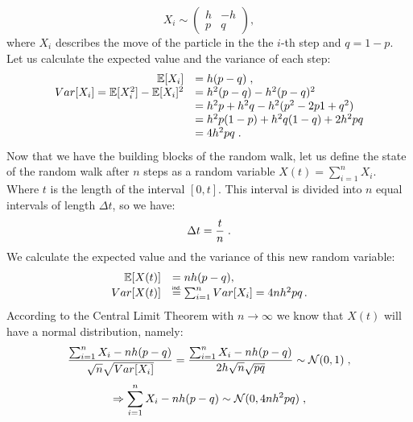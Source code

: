 \documentclass[times, utf8, diplomski]{fer}
\begin{document}
\begin{equation}
X_i \sim \left( \begin{array}{cc} h & -h \\
					p & q \end{array} \right),
\end{equation}
where $X_i$ describes the move of the particle in the the $i$-th step and $q=1-p$.
Let us calculate the expected value and the variance of each step:
\begin{equation}
	\begin{array}{rl}
									\mathbb{E}[X_i] &= h(p-q)\hspace{0.1cm}, \\
		Var[X_i] = \mathbb{E}[X_i^2] - \mathbb{E}[X_i]^2 &= h^2(p-q) - h^2(p-q)^2 \\
										&= h^2p + h^2q - h^2(p^2 - 2p1 + q^2)\\
										&= h^2p(1-p) + h^2q(1-q) + 2h^2pq\\
										&= 4h^2pq\hspace{0.1cm}. \\
	\end{array}
\end{equation}
Now that we have the building blocks of the random walk, let us define the state of the random walk after $n$ steps as a random variable $X(t) = \sum_{i=1}^n X_i$. Where $t$ is the length of the interval $[0,t]$. This interval is divided into $n$ equal intervals of length $\Delta t$, so we have:
\begin{equation}
	\Delta t = \frac{t}{n}\hspace{0.1cm}.
\end{equation}
We calculate the expected value and the variance of this new random variable:
\begin{equation}
	\begin{array}{rl}
		\mathbb{E}[X(t)] &= nh(p-q), \\
		Var[X(t)] &\indeq \sum_{i=1}^n Var[X_i] = 4nh^2pq \hspace{0.05cm}.\\
	\end{array}
\end{equation}
According to the Central Limit Theorem with $n \rightarrow \infty$ we know that $X(t)$ will have a normal distribution, namely:
$$ \frac{\sum_{i=1}^n X_i - nh(p-q)}{\sqrt{n}\sqrt{Var[X_i]}} = \frac{\sum_{i=1}^n X_i - nh(p-q)}{2h\sqrt{n}\sqrt{pq}} \sim \mathcal{N}(0,1)\hspace{0.1cm}, $$
$$ \Rightarrow \sum_{i=1}^n X_i - nh(p-q) \sim \mathcal{N}(0,4nh^2pq)\hspace{0.1cm},$$
\end{document}
